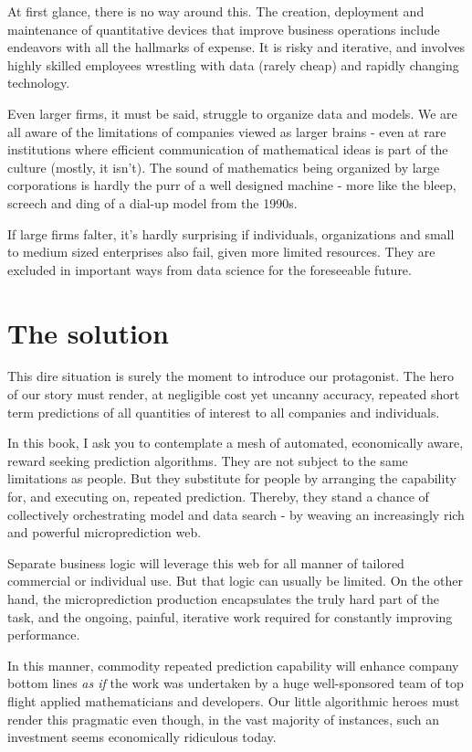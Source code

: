 At first glance, there is no way around this. The creation, deployment and maintenance of quantitative devices that improve business operations include endeavors with all the hallmarks of expense. It is risky and iterative, and involves highly skilled employees wrestling with data (rarely cheap) and rapidly changing technology. 

Even larger firms, it must be said, struggle to organize data and models. We are all aware of the limitations of companies viewed as larger brains - even at rare institutions where efficient communication of mathematical ideas is part of the culture (mostly, it isn't). The sound of mathematics being organized by large corporations is hardly the purr of a well designed machine - more like the bleep, screech and ding of a dial-up model from the 1990s.   

If large firms falter, it's hardly surprising if individuals, organizations and small to medium sized enterprises also fail, given more limited resources. They are excluded in important ways from data science for the foreseeable future. 


\section{The solution}

This dire situation is surely the moment to introduce our protagonist. The hero of our story must render, at negligible cost yet uncanny accuracy, repeated short term predictions of all quantities of interest to all companies and individuals.


In this book, I ask you to contemplate a mesh of automated, economically aware, reward seeking prediction algorithms. They are not subject to the same limitations as people. But they substitute for people by arranging the capability for, and executing on, repeated prediction. Thereby, they stand a chance of collectively orchestrating model and data search - by weaving an increasingly rich and powerful microprediction web. 
 

Separate business logic will leverage this web for all manner of tailored commercial or individual use. But that logic can usually be limited. On the other hand, the microprediction production encapsulates the truly hard part of the task, and the ongoing, painful, iterative work required for constantly improving performance. 


In this manner, commodity repeated prediction capability will enhance company bottom lines {\em as if} the work was undertaken by a huge well-sponsored team of top flight applied mathematicians and developers. Our little algorithmic heroes must render this pragmatic even though, in the vast majority of instances, such an investment seems economically ridiculous today.  



